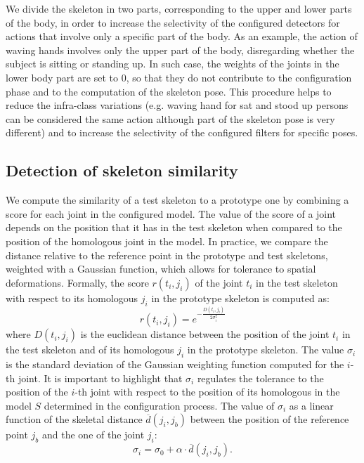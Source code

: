 \documentclass[runningheads,a4paper]{llncs}
\begin{document}
We divide the skeleton in two parts, corresponding to the upper and lower parts of the body, in order to increase the selectivity of the configured detectors for actions that involve only a specific part of the body. As an example, the action of waving hands involves only the upper part of the body, disregarding whether the subject is sitting or standing up. In such case, the weights of the joints in the lower body part are set to $0$, so that they do not contribute to the configuration phase and to the computation of the skeleton pose. This procedure helps to reduce the infra-class variations (e.g. waving hand for sat and stood up persons can be considered the same action although part of the skeleton pose is very different) and to increase the selectivity of the configured filters for specific poses. 

\subsection{Detection of skeleton similarity}
We compute the similarity of a test skeleton to a prototype one by combining a score for each joint in the configured model. The value of the score of a joint depends on the position that it has in the test skeleton when compared to the position of the homologous joint in the model. 
In practice, we compare the distance relative to the reference point in the prototype and test skeletons, weighted with a Gaussian function, which allows for tolerance to spatial deformations.
Formally, the score $r(t_i, j_i)$ of the joint $t_i$ in the test skeleton with respect to its homologous $j_i$ in the prototype skeleton is computed as:
\begin{equation}
r(t_i,j_i) = 
e^{-\frac{D(t_i, j_i)}{2\sigma_i^2}}
\end{equation} 
where $D(t_i ,j_i)$ is the euclidean distance between the position of the joint $t_i$ in the test skeleton and of its homologous $j_i$ in the prototype skeleton. 
The value  $\sigma_i$ is the standard deviation of the Gaussian weighting function computed for the $i$-th joint. It is important to highlight that $\sigma_i$ regulates the tolerance to the position of the $i$-th joint with respect to the position of its homologous in the model $S$ determined in the configuration process.
The value of $\sigma_i$ as a linear function of the skeletal distance $\overline{d}(j_i, j_b)$ between the position of the reference point  $j_b$ and the one of the joint $j_i$:
\begin{equation}
 \sigma_i = \sigma_{0} + \alpha \cdot \overline{d}(j_i, j_b).
\end{equation}
\end{document}
